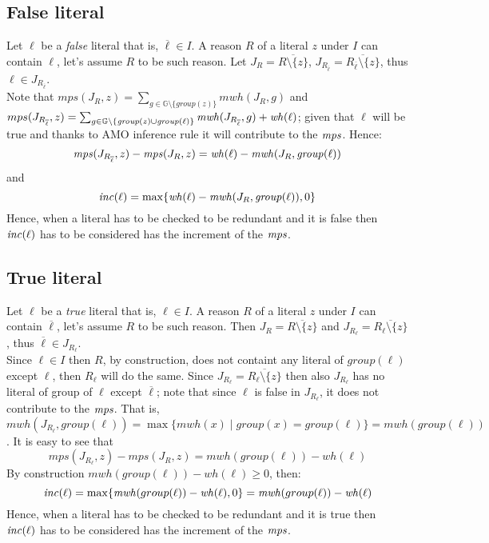 \subsection{False literal}
Let $\ell$ be a \textit{false} literal that is,
$\overline{\ell} \in I$. 
A reason $R$ of a literal $z$ under $I$ can contain $\ell$, let's assume $R$ to be 
such reason.
Let $J_R = \overline{R \setminus \{z\}}$, 
$J_{R_{\overline{\ell}}} = \overline{R_{\overline{\ell}} \setminus \{z\}}$, thus
$\ell \in J_{R_{\overline{\ell}}}$.\\
Note that $mps(J_R,z) = \sum_{g \in \mathbb{G} \setminus
\{\mathit{group}(z)\}}{\mathit{mwh}(J_R,g)}$ and \\
$mps(J_{R_{\overline{\ell}}},z) = \sum_{g \in \mathbb{G} \setminus
\{\mathit{group}(z) \cup \mathit{group}(\ell)\}}
{\mathit{mwh}(J_{R_{\overline{\ell}}},g) + \mathit{wh}(\ell)}$;
given that $\ell$ will be true and thanks to AMO inference rule it will 
contribute to the $\mathit{mps}$.
Hence: $$\mathit{mps}(J_{R_{\overline{\ell}}},z)-\mathit{mps}(J_R,z) = 
\mathit{wh}(\ell) - \mathit{mwh}(J_R,\mathit{group}(\ell))$$ and 
$$ \mathit{inc}(\ell) = \max\{\mathit{wh}(\ell) - \mathit{mwh}(J_R,\mathit{group}(\ell)),0\}$$
Hence, when a literal has to be checked to be redundant and it is false then 
$\mathit{inc}(\ell)$ has to be considered has the increment of the $\mathit{mps}$.

\subsection{True literal}
Let $\ell$ be a \textit{true} literal that is,
$\ell \in I$. 
A reason $R$ of a literal $z$ under $I$ can contain $\overline{\ell}$, let's assume $R$ to be 
such reason.
Then  $J_R = \overline{R \setminus \{z\}}$ and $J_{R_{\ell}} = \overline{R_{\ell} \setminus \{z\}}$, thus
$\overline{\ell} \in J_{R_{\ell}}$.\\ 
Since $\ell \in I$ then $R$, by construction, does not containt any literal of $group(\ell)$ 
except $\ell$, then $R_{\ell}$ will do the same.
Since $J_{R_{\ell}} = \overline{R_{\ell} \setminus \{z\}}$ then also $J_{R_{\ell}}$ 
has no literal of group of $\ell$
except $\overline{\ell}$; note that since $\ell$ is false in $J_{R_\ell}$, it does not contribute to the $\mathit{mps}$.
That is, $\mathit{mwh}(J_{R_{\ell}},group(\ell))= \max\{ \mathit{mwh}(x) \mid \mathit{group}(x) = group(\ell) \} 
= \mathit{mwh}(group(\ell))$.
It is easy to see that
$$\mathit{mps}(J_{R_{\ell}},z)-\mathit{mps}(J_R,z) = \mathit{mwh}(group(\ell)) - \mathit{wh}(\ell)$$
By construction $\mathit{mwh}(group(\ell)) - \mathit{wh}(\ell) \ge 0$, then:
$$\mathit{inc}(\ell) = \max\{\mathit{mwh}(group(\ell)) - \mathit{wh}(\ell),0\} = \mathit{mwh}(group(\ell)) - \mathit{wh}(\ell)$$
Hence, when a literal has to be checked to be redundant and it is true then 
$\mathit{inc}(\ell)$ has to be considered has the increment of the $\mathit{mps}$.

